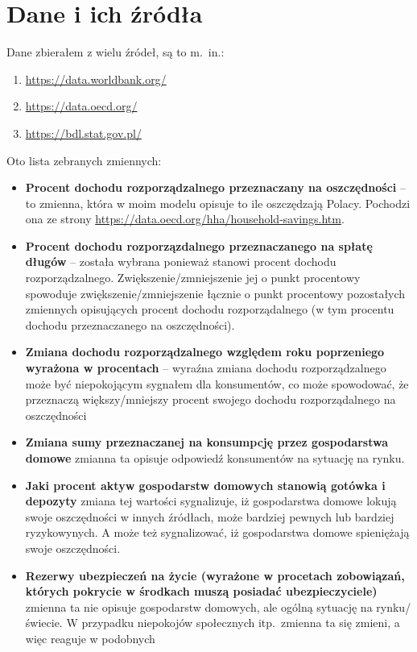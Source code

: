 \documentclass[a4paper,12pt,polish]{article}
\begin{document}
\section{Dane i ich źródła}
Dane zbierałem z wielu źródeł, są to m.\ in.:
\begin{enumerate}
    \item \url{https://data.worldbank.org/}
    \item \url{https://data.oecd.org/}
    \item \url{https://bdl.stat.gov.pl/}
\end{enumerate}
Oto lista zebranych zmiennych:
\begin{itemize}
    \item \textbf{Procent dochodu rozporządzalnego przeznaczany na oszczędności} – to zmienna, która
    w moim modelu opisuje to ile oszczędzają Polacy. Pochodzi ona ze strony \url{https://data.oecd.org/hha/household-savings.htm}.
    \item \textbf{Procent dochodu rozporzązdalnego przeznaczanego na spłatę długów} – została 
    wybrana ponieważ stanowi procent dochodu rozporządzalnego. Zwiększenie/zmniejszenie
    jej o punkt procentowy spowoduje zwiększenie/zmniejszenie łącznie o punkt procentowy 
    pozostałych zmiennych opisujących procent dochodu rozporządalnego (w tym procentu 
    dochodu przeznaczanego na oszczędności).
    \item \textbf{Zmiana dochodu rozporządzalnego względem roku poprzeniego wyrażona w procentach} – wyraźna zmiana
    dochodu rozporządzalnego może być niepokojącym sygnałem dla konsumentów, co może spowodować, że 
    przeznaczą większy/mniejszy procent swojego dochodu rozporządalnego na oszczędności
    \item \textbf{Zmiana sumy przeznaczanej na konsumpcję przez gospodarstwa domowe} zmianna ta 
    opisuje odpowiedź konsumentów na sytuację na rynku.
    \item \textbf{Jaki procent aktyw gospodarstw domowych stanowią gotówka i depozyty} zmiana tej wartości
    sygnalizuje, iż gospodarstwa domowe lokują swoje oszczędności w innych źródłach, może bardziej pewnych
    lub bardziej ryzykowynych. A może też sygnalizować, iż gospodarstwa domowe spieniężają 
    swoje oszczędności.
    \item \textbf{Rezerwy ubezpieczeń na życie (wyrażone w procetach zobowiązań, których pokrycie w środkach muszą posiadać ubezpieczyciele)}
    zmienna ta nie opisuje gospodarstw domowych, ale ogólną sytuację na rynku/świecie. W
    przypadku niepokojów społecznych itp.\ zmienna ta się zmieni, a więc reaguje w podobnych

\end{itemize}
\end{document}
